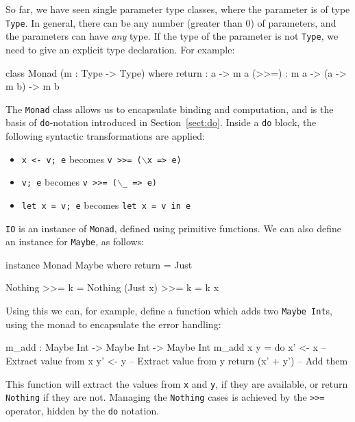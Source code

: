 \label{sec:monad}

So far, we have seen single parameter type classes, where the parameter is of type \texttt{Type}.
In general, there can be any number (greater than 0) of parameters, and the parameters can have \emph{any} type.
If the type of the parameter is not \texttt{Type}, we need to give an explicit type declaration.
For example:

\begin{code}
class Monad (m : Type -> Type) where
    return : a -> m a
    (>>=)  : m a -> (a -> m b) -> m b
\end{code}

\noindent
The \texttt{Monad} class allows us to encapsulate binding and computation, and is the basis of \texttt{do}-notation introduced in Section~\ref{sect:do}.
Inside a \texttt{do} block, the following syntactic transformations are applied:

\begin{itemize}
\item \texttt{x <- v; e} becomes \texttt{v >>= ($\backslash$x => e)}
\item \texttt{v; e} becomes \texttt{v >>= ($\backslash$\_ => e)}
\item \texttt{let x = v; e} becomes \texttt{let x = v in e}
\end{itemize}

\noindent
\texttt{IO} is an instance of \texttt{Monad}, defined using primitive functions.
We can also define an instance for \texttt{Maybe}, as follows:

\begin{code}
instance Monad Maybe where
    return = Just

    Nothing  >>= k = Nothing
    (Just x) >>= k = k x
\end{code}

\noindent
Using this we can, for example, define a function which adds two \texttt{Maybe Int}s, using the monad to encapsulate the error handling:

\begin{code}
m_add : Maybe Int -> Maybe Int -> Maybe Int
m_add x y = do x' <- x -- Extract value from x
               y' <- y -- Extract value from y
               return (x' + y') -- Add them 
\end{code}

\noindent
This function will extract the values from \texttt{x} and \texttt{y}, if they are available, or return \texttt{Nothing} if they are not.
Managing the \texttt{Nothing} cases is achieved by the \texttt{>>=} operator, hidden by the \texttt{do} notation.

